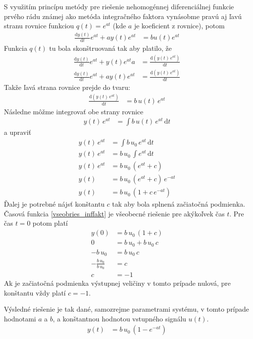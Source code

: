 \documentclass[a4paper, 10pt, ]{article}
\begin{document}
S využitím princípu metódy pre riešenie nehomogénnej diferenciálnej funkcie prvého rádu známej ako metóda integračného faktora vynásobme pravú aj ľavú stranu rovnice funkciou $q(t) = e^{at}$ (kde $a$ je koeficient z rovnice), potom
\begin{align}
    \frac{ \text{d}y(t)}{\text{d}t} e^{at} + a y(t) e^{at} &=   b u(t) e^{at}
\end{align}
Funkcia $q(t)$ tu bola skonštruovaná tak aby platilo, že
\begin{align}
    \frac{ \text{d}y(t)}{\text{d}t} e^{at} +  y(t) e^{at} a &=   \frac{ \text{d} \left(y(t)\, e^{at}\right)}{\text{d}t} \\
    \frac{ \text{d}y(t)}{\text{d}t} e^{at} + a y(t) e^{at} &=   \frac{ \text{d} \left(y(t)\, e^{at}\right)}{\text{d}t}
\end{align}
Takže ľavá strana rovnice prejde do tvaru:
\begin{align}
    \frac{ \text{d} \left(y(t)\, e^{at}\right)}{\text{d}t} &= b\, u(t)\, e^{at}
\end{align}
Následne môžme integrovať obe strany rovnice
\begin{align}
    y(t)\, e^{at} &= \int  b\, u(t)\, e^{at}\, \text{d}t 
\end{align}
a upraviť
\begin{align}
    y(t)\, e^{at} &= \int  b\, u_0\, e^{at}\, \text{d}t \\
    y(t)\, e^{at} &=  b\, u_0\, \int   e^{at}\, \text{d}t \\
    y(t)\, e^{at} &=  b\, u_0\,   \left( e^{at} + c \right) \\
    y(t)  &=  b\, u_0\,   \left( e^{at} + c \right)\, e^{-at} \\
    y(t)  &=  b\, u_0\,   \left( 1 + c\, e^{-at} \right) \label{vseobries_inffakt}
\end{align}
Ďalej je potrebné nájsť konštantu $c$ tak aby bola splnená začiatočná podmienka. Časová funkcia \eqref{vseobries_inffakt} je všeobecné riešenie pre akýkoľvek čas $t$. Pre čas $t=0$ potom platí
\begin{align}
    y(0)  &=  b\, u_0\,   \left( 1 + c  \right) \\
    0  &=  b\, u_0 +  b\, u_0 \, c  \\
    - b\, u_0  &=    b\, u_0 \, c  \\
    -\frac{ b\, u_0}{b\, u_0}  &=     c  \\
    c &= -1
\end{align}
Ak je začiatočná podmienka výstupnej veličiny v tomto prípade nulová, pre konštantu vždy platí $c = -1$.

Výsledné riešenie je tak dané, samozrejme parametrami systému, v tomto prípade hodnotami $a$ a $b$, a konštantnou hodnotou vstupného signálu $u(t)$.
\begin{align}
    y(t)  &=  b\, u_0\,   \left( 1 - e^{-at} \right) 
\end{align}
\end{document}

